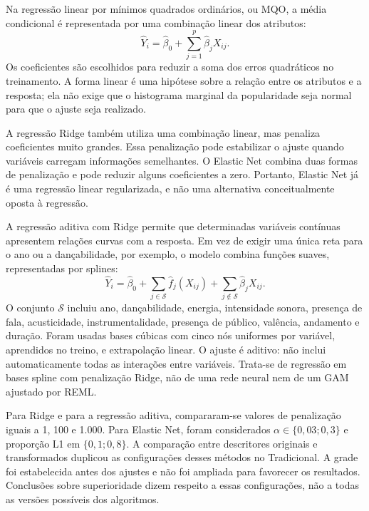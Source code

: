 Na regressão linear por mínimos quadrados ordinários, ou MQO, a média condicional é representada por uma combinação linear dos atributos:
\begin{equation}
\widehat{Y}_i=\widehat{\beta}_0+\sum_{j=1}^{p}\widehat{\beta}_j X_{ij}.
\end{equation}
Os coeficientes são escolhidos para reduzir a soma dos erros quadráticos no treinamento. A forma linear é uma hipótese sobre a relação entre os atributos e a resposta; ela não exige que o histograma marginal da popularidade seja normal para que o ajuste seja realizado.

A regressão Ridge também utiliza uma combinação linear, mas penaliza coeficientes muito grandes. Essa penalização pode estabilizar o ajuste quando variáveis carregam informações semelhantes. O Elastic Net combina duas formas de penalização e pode reduzir alguns coeficientes a zero. Portanto, Elastic Net já é uma regressão linear regularizada, e não uma alternativa conceitualmente oposta à regressão.

A regressão aditiva com Ridge permite que determinadas variáveis contínuas apresentem relações curvas com a resposta. Em vez de exigir uma única reta para o ano ou a dançabilidade, por exemplo, o modelo combina funções suaves, representadas por splines:
\begin{equation}
\widehat{Y}_i=\widehat{\beta}_0+\sum_{j\in\mathcal{S}}\widehat{f}_j(X_{ij})+
\sum_{j\notin\mathcal{S}}\widehat{\beta}_jX_{ij}.
\end{equation}
O conjunto $\mathcal{S}$ incluiu ano, dançabilidade, energia, intensidade sonora, presença de fala, acusticidade, instrumentalidade, presença de público, valência, andamento e duração. Foram usadas bases cúbicas com cinco nós uniformes por variável, aprendidos no treino, e extrapolação linear. O ajuste é aditivo: não inclui automaticamente todas as interações entre variáveis. Trata-se de regressão em bases spline com penalização Ridge, não de uma rede neural nem de um GAM ajustado por REML.

Para Ridge e para a regressão aditiva, compararam-se valores de penalização iguais a 1, 100 e 1.000. Para Elastic Net, foram considerados $\alpha\in\{0{,}03;0{,}3\}$ e proporção L1 em $\{0{,}1;0{,}8\}$. A comparação entre descritores originais e transformados duplicou as configurações desses métodos no Tradicional. A grade foi estabelecida antes dos ajustes e não foi ampliada para favorecer os resultados. Conclusões sobre superioridade dizem respeito a essas configurações, não a todas as versões possíveis dos algoritmos.

